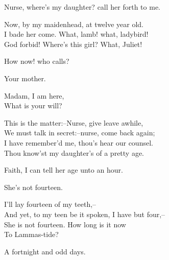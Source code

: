  
\begin{speech}
Nurse, where's my daughter? call her forth to me.
\\
\end{speech}
\begin{speech}
Now, by my maidenhead, at twelve year old. \\
I bade her come. What, lamb! what, ladybird! \\
God forbid!   Where's this girl?     What, Juliet! 
\\
\end{speech}
\begin{speech}
How now! who calls? \\
\end{speech}
\begin{speech}
Your mother. \\
\end{speech}
\begin{speech}
Madam, I am here, \\
What is your will? \\
\end{speech}
\begin{speech}
This is the matter:--Nurse, give leave awhile,
\\
We must talk in secret:--nurse, come back again; \\
I have remember'd me, thou's hear our counsel. \\
Thou know'st my daughter's of a pretty age. \\
\end{speech}
\begin{speech}
Faith, I can tell her age unto an hour.
\end{speech}
\begin{speech}
She's not fourteen.
\end{speech}
\begin{speech}
I'll lay fourteen of my teeth,-- \\
And yet, to my teen be it spoken, I have but four,-- \\
She is not fourteen. How long is it now \\
To Lammas-tide? \\
\end{speech}
\begin{speech}
A fortnight and odd days.
\end{speech}
